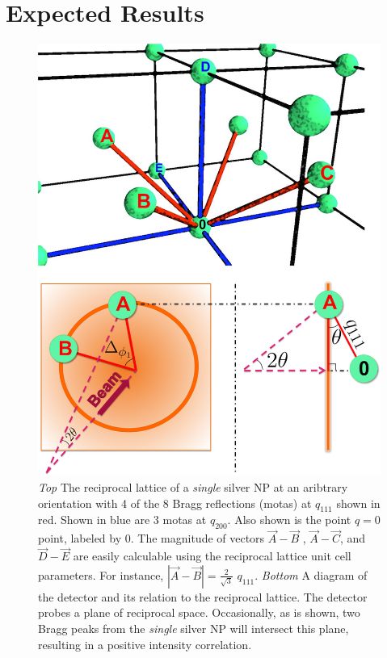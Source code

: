 \documentclass[a4paper,12pt]{article}
\begin{document}
\section*{Expected Results}

\begin{figure}
\centering
	\includegraphics[scale=0.85]{./figure_EXPECTED_updated1.png}
	\caption{ \textit{Top} The reciprocal lattice of a \emph{single} silver NP at an aribtrary orientation with 4 of the 8 Bragg reflections (motas) at $q_{111}$ shown in red. Shown in blue are 3 motas at $q_{200}$. Also shown is the point $q=0$ point, labeled by 0. The magnitude of vectors $\vec{A}-\vec{B}$ , $\vec{A}-\vec{C}$, and $\vec{D}-\vec{E}$ are easily calculable using the reciprocal lattice unit cell parameters. For instance, $\left |\vec{A} - \vec{B}\right | = \frac{2}{\sqrt{3}}\,\,q_{111}$. \textit{Bottom} A diagram of the detector and its relation to the reciprocal lattice. The detector probes a plane of reciprocal space. Occasionally, as is shown, two Bragg peaks from the \emph{single} silver NP will intersect this plane, resulting in a positive intensity correlation. }
\label{EXPECTED}
\end{figure}
\end{document}
